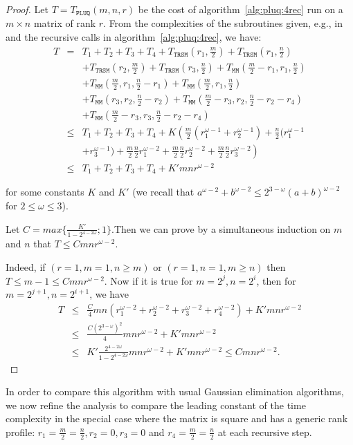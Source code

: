 \documentclass{article}
\newcommand{\pluq}{\texttt{PLUQ}\xspace}
\newcommand{\trsm}{\texttt{TRSM}\xspace}
\newcommand{\MM}{\texttt{MM}\xspace}
\newcommand{\mm}{\frac{m}{2}}
\newcommand{\nn}{\frac{n}{2}}
\begin{document}
\begin{proof}
Let $T=T_\pluq(m,n,r)$ be the cost of algorithm~\ref{alg:pluq:4rec} run on a
$m\times n$ matrix of rank $r$. From the complexities of the subroutines given, e.g., in~\cite{jgd:2008:toms} and the recursive calls in algorithm~\ref{alg:pluq:4rec}, we have:
\begin{eqnarray*}
  T &=& T_1+T_2+T_3+T_4
+ T_{\trsm}(r_1, \mm) + T_{\trsm}(r_1, \nn)\\
&&+ T_{\trsm}(r_2, \mm) + T_{\trsm}(r_3, \nn) +T_\MM(\mm-r_1,r_1,\nn)\\
&& +T_\MM(\mm,r_1,\nn-r_1) +T_\MM(\mm,r_1,\nn)\\
&&+ T_\MM(r_3,r_2,\nn-r_2)+ T_\MM(\mm-r_3,r_2,\nn-r_2-r_4)\\
&& +T_\MM(\mm-r_3,r_3,\nn-r_2-r_4)\\
&\leq& T_1+T_2+T_3+T_4
+ K\left(\mm(r_1^{\omega-1}+r_2^{\omega-1})+\nn(r_1^{\omega-1}\right.\\
&&\left.+ r_3^{\omega-1}) + \mm \nn r_1^{\omega-2} + \mm \nn
  r_2^{\omega-2} + \mm \nn r_3^{\omega-2}\right)\\ 
&\leq&  T_1+T_2+T_3+T_4
+ K'mnr^{\omega-2} 
\end{eqnarray*}

for some constants $K$ and $K'$ (we recall that $a^{\omega-2}+b^{\omega-2} \leq
2^{3-\omega}(a+b)^{\omega-2}$ for $2\leq \omega\leq 3$).

Let $C=max\{\frac{K'}{1-2^{4-2\omega}};1\}$.Then we can prove by a simultaneous induction on $m$ and $n$ that 
$ T \leq Cmnr^{\omega-2}$.

Indeed, if $(r=1,m=1,n\geq m)$ or $(r=1,n=1,m\geq n)$ then $T\leq m-1\leq Cmnr^{\omega-2}$.
Now if it is true for $m=2^j,n=2^i$, then for $m=2^{j+1},n=2^{i+1}$, we have
 \begin{eqnarray*}
 T &\leq& \frac{C}{4}mn(r_1^{\omega-2}+r_2^{\omega-2}+r_3^{\omega-2}+r_4^{\omega-2}) +K'mnr^{\omega-2} \\
   &\leq& \frac{C(2^{3-\omega})^2}{4}mnr^{\omega-2}   +K'mnr^{\omega-2} \\
   &\leq& K'\frac{2^{4-2\omega}}{1-2^{4-2\omega}}mnr^{\omega-2}   +K'mnr^{\omega-2} \leq Cmnr^{\omega-2}.
 \end{eqnarray*}
\end{proof}

In order to compare this algorithm with usual Gaussian elimination algorithms,
we now refine the analysis to compare the leading constant of the time
complexity in the special case where the matrix is square and has a generic rank
profile: $r_1=\mm=\nn, r_2=0,  r_3=0$ and $r_4=\mm=\nn$ at each recursive step. 
\end{document}

